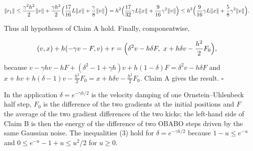 \documentclass[11pt,a4paper]{article}
\begin{document}
\[\|r_1\|\le\frac{\gamma^2h^2}2\|v\|+\frac{\gamma h^2}2\Bigl(\frac{17}{16}L\|x\|+\frac\gamma8\|v\|\Bigr)=h^2\Bigl(\frac{17}{32}\gamma L\|x\|+\frac9{16}\gamma^2\|v\|\Bigr)\le h^2\Bigl(\frac9{16}\gamma L\|x\|+\frac58\gamma^2\|v\|\Bigr).\]


Thus all hypotheses of Claim A hold. Finally, componentwise,


\[(v,x)+h(-\gamma v-F,v)+r=\Bigl(\delta^2v-h\delta F,\ x+h\delta v-\frac{h^2}2F_0\Bigr),\]


because \(v-\gamma hv-hF+(\delta^2-1+\gamma h)v+h(1-\delta)F=\delta^2v-h\delta F\) and \(x+hv+h(\delta-1)v-\frac{h^2}2F_0=x+h\delta v-\frac{h^2}2F_0\). Claim A gives the result. \(\square\)




In the application \(\delta=e^{-\gamma h/2}\) is the velocity damping of one Ornstein–Uhlenbeck half step, \(F_0\) is the difference of the two gradients at the initial positions and \(F\) the average of the two gradient differences of the two kicks; the left-hand side of Claim B is then the energy of the difference of two OBABO steps driven by the same Gaussian noise. The inequalities (3) hold for \(\delta=e^{-\gamma h/2}\) because \(1-u\le e^{-u}\) and \(0\le e^{-u}-1+u\le u^2/2\) for \(u\ge0\).
\end{document}
